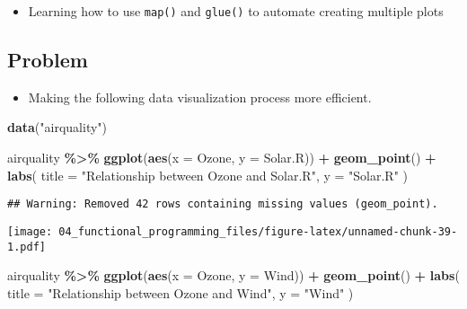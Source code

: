 \documentclass[
]{book}
\newenvironment{Shaded}{\begin{snugshade}}{\end{snugshade}}
\newcommand{\DataTypeTok}[1]{\textcolor[rgb]{0.13,0.29,0.53}{#1}}
\newcommand{\KeywordTok}[1]{\textcolor[rgb]{0.13,0.29,0.53}{\textbf{#1}}}
\newcommand{\NormalTok}[1]{#1}
\newcommand{\OperatorTok}[1]{\textcolor[rgb]{0.81,0.36,0.00}{\textbf{#1}}}
\newcommand{\StringTok}[1]{\textcolor[rgb]{0.31,0.60,0.02}{#1}}
\providecommand{\tightlist}{%
  \setlength{\itemsep}{0pt}\setlength{\parskip}{0pt}}
\begin{document}
\begin{itemize}
\tightlist
\item
  Learning how to use \texttt{map()} and \texttt{glue()} to automate creating multiple plots
\end{itemize}

\hypertarget{problem-1}{%
\subsection{Problem}\label{problem-1}}

\begin{itemize}
\tightlist
\item
  Making the following data visualization process more efficient.
\end{itemize}

\begin{Shaded}
\begin{Highlighting}[]
\KeywordTok{data}\NormalTok{(}\StringTok{"airquality"}\NormalTok{)}

\NormalTok{airquality }\OperatorTok{\%\textgreater{}\%}
\StringTok{  }\KeywordTok{ggplot}\NormalTok{(}\KeywordTok{aes}\NormalTok{(}\DataTypeTok{x =}\NormalTok{ Ozone, }\DataTypeTok{y =}\NormalTok{ Solar.R)) }\OperatorTok{+}
\StringTok{  }\KeywordTok{geom\_point}\NormalTok{() }\OperatorTok{+}
\StringTok{  }\KeywordTok{labs}\NormalTok{(}
    \DataTypeTok{title =} \StringTok{"Relationship between Ozone and Solar.R"}\NormalTok{,}
    \DataTypeTok{y =} \StringTok{"Solar.R"}
\NormalTok{  )}
\end{Highlighting}
\end{Shaded}

\begin{verbatim}
## Warning: Removed 42 rows containing missing values (geom_point).
\end{verbatim}

\texttt{[image: 04\_functional\_programming\_files/figure-latex/unnamed-chunk-39-1.pdf]}

\begin{Shaded}
\begin{Highlighting}[]
\NormalTok{airquality }\OperatorTok{\%\textgreater{}\%}
\StringTok{  }\KeywordTok{ggplot}\NormalTok{(}\KeywordTok{aes}\NormalTok{(}\DataTypeTok{x =}\NormalTok{ Ozone, }\DataTypeTok{y =}\NormalTok{ Wind)) }\OperatorTok{+}
\StringTok{  }\KeywordTok{geom\_point}\NormalTok{() }\OperatorTok{+}
\StringTok{  }\KeywordTok{labs}\NormalTok{(}
    \DataTypeTok{title =} \StringTok{"Relationship between Ozone and Wind"}\NormalTok{,}
    \DataTypeTok{y =} \StringTok{"Wind"}
\NormalTok{  )}
\end{Highlighting}
\end{Shaded}
\end{document}
